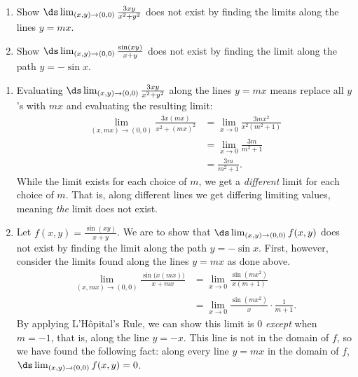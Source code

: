 

\begin{example}\label{ex_multilimit4}%
\mbox{}\\[-2\baselineskip]\parbox[t]{\linewidth}{\begin{enumerate}
	\item Show $\ds \lim_{(x,y)\to (0,0)} \frac{3xy}{x^2+y^2}$ does not exist by finding the limits along the lines $y=mx$.
	\item	Show $\ds \lim_{(x,y)\to (0,0)} \frac{\sin(xy)}{x+y}$ does not exist by finding the limit along the path $y=-\sin x$. 	
\end{enumerate}}\vspace{0pt}
\solution
\begin{enumerate}
	\item Evaluating $\ds \lim_{(x,y)\to (0,0)} \frac{3xy}{x^2+y^2}$ along the lines $y=mx$ means replace all $y$'s with $mx$ and evaluating the resulting limit:
	\begin{align*}
	\lim_{(x,mx)\to (0,0)} \frac{3x(mx)}{x^2+(mx)^2} &=\lim_{x\to 0} \frac{3mx^2}{x^2(m^2+1)}\\
				&= \lim_{x\to 0} \frac{3m}{m^2+1}\\
				&= \frac{3m}{m^2+1}.
	\end{align*}
	While the limit exists for each choice of $m$, we get a \emph{different} limit for each choice of $m$. That is, along different lines we get differing limiting values, meaning \emph{the} limit does not exist.
	
	\item		Let $f(x,y) = \frac{\sin(xy)}{x+y}$. We are to show that $\ds \lim_{(x,y)\to (0,0)} f(x,y)$ does not exist by finding the limit along the path $y=-\sin x$. First, however, consider the limits found along the lines $y=mx$ as done above.
	\begin{align*}
	\lim_{(x,mx)\to (0,0)} \frac{\sin\bigl(x(mx)\bigr)}{x+mx} &= \lim_{x\to 0} \frac{\sin (mx^2)}{x(m+1)} \\
	&= \lim_{x\to 0} \frac{\sin(mx^2)}{x}\cdot\frac1{m+1}.
	\end{align*}
	By applying L'Hôpital's Rule, we can show this limit is 0 \emph{except} when $m=-1$, that is, along the line $y=-x$. This line is not in the domain of $f$, so we have found the following fact: along every line $y=mx$ in the domain of $f$, $\ds \lim_{(x,y)\to(0,0)} f(x,y)=0$. %
	

\end{enumerate}
\end{example}
